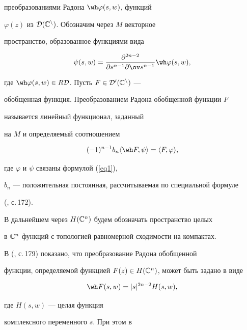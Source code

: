преобразованиями Радона $\wh \varphi(s,w)$, функций


$\varphi(z)$ из $\cal D(\Bbb C^{n})$. Обозначим через $M$ векторное 


пространство, образованное функциями вида 


\begin{equation} \label{eq1}


\psi (s,w)=\frac {\partial^{2n-2}}{\partial {s^{n-1}}\partial \ov s^{n-1}}


\wh \varphi(s,w), 


\end{equation} 


где $\wh \varphi(s,w) \in R\cal D$. Пусть $F\in \cal D'(\Bbb C^n)$ ---


обобщенная функция. Преобразованием Радона обобщенной функции $F$ 


называется линейный функционал, заданный 


на $M$ и определяемый соотношением 


\begin{equation} \label{eq2}


(-1)^{n-1}b_{n}\la\wh F,\psi\ra=\la F,\varphi\ra, 


\end{equation} 


где $\varphi$ и $\psi$ связаны формулой (\ref{eq1}), 


$b_n$ --- положительная постоянная, рассчитываемая по специальной формуле 


(\cite{Gelf}, с.\,172).


 


В дальнейшем через $H(\Bbb C^n)$ будем обозначать пространство целых 


в $\Bbb C^n$ функций с топологией равномерной сходимости на компактах.


В (\cite{Gelf}, с.\,179) показано, что преобразование Радона обобщенной 


функции, определяемой функцией $F(z) \in H(\Bbb C^n)$, может быть задано в виде 


\begin{equation} \label{eq3}


\wh F(s,w)=|s|^{2n-2}H(s,w),


\end{equation}


где $H(s,w)$ --- целая функция 


комплексного переменного $s$. При этом в \cite{Gelf}


